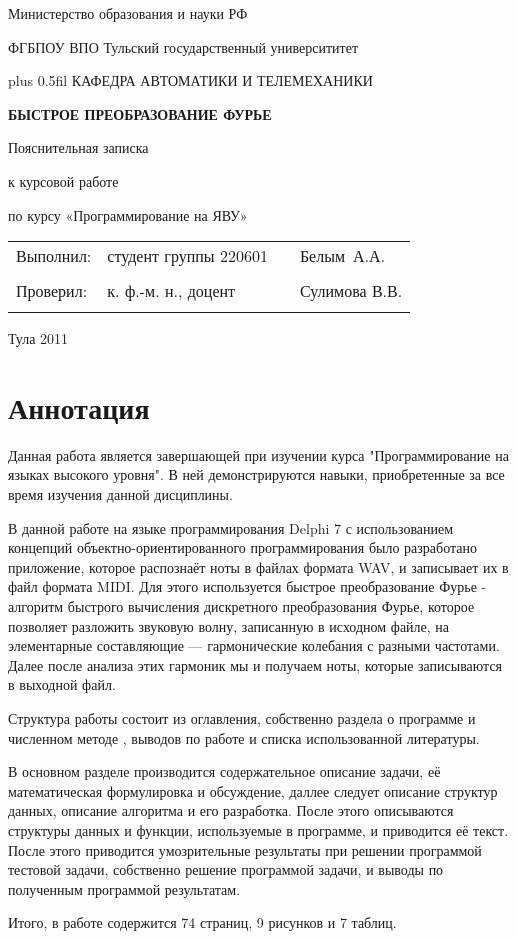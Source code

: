 \documentclass[a4paper,12pt,russian]{article}
\makeatletter
\renewcommand{\normalfont}{\fontsize{14}{20}\fontfamily{ftm}\linespread{1.25}\selectfont}
\renewcommand{\tiny}{\fontsize{12}{14}\fontfamily{ftm}\linespread{1.0}\selectfont}
\renewcommand{\maketitle}[1]{
\begin{titlepage}
\begin{center}\linespread{1}\parskip=0.0cm\normalfont
Министерство образования и науки РФ

ФГБПОУ ВПО Тульский государственный университитет

\vskip 0pt plus 0.5fil
КАФЕДРА АВТОМАТИКИ И ТЕЛЕМЕХАНИКИ

\vfill
\textbf{#1}

\vskip 2cm
Пояснительная записка 

к курсовой работе


по курсу «Программирование на ЯВУ»

\vfill

\vfill
\begin{tabular*}{\textwidth}{ll@{\extracolsep{\fill}}c@{\extracolsep{0pt}}l}
Выполнил: & студент группы 220601&&Белым~А.А.\\ \cline{3-3}
								&&\tiny{(подпись)}& 	\\
Проверил: & к. ф.-м. н., доцент &&Сулимова В.В.\\ \cline{3-3}
								&&\tiny{(подпись)}& 	\\
\end{tabular*}
\vfill
Тула 2011
\end{center}
\end{titlepage}
}
\newcommand{\ssec}[1]{\section{#1}\hspace*{\parindent}}
\makeatother
\begin{document}
\maketitle {БЫСТРОЕ ПРЕОБРАЗОВАНИЕ ФУРЬЕ}
\ssec{Аннотация}
\normalfont
Данная   работа   является   завершающей   при   изучении   курса 
"Программирование   на   языках   высокого   уровня".   В   ней   демонстрируются 
навыки, приобретенные за все время изучения данной дисциплины.
 
В данной работе на языке программирования Delphi 7 с использованием концепций объектно-ориентированного программирования было разработано приложение, которое распознаёт ноты в файлах формата WAV, и записывает их в файл формата MIDI. Для этого используется быстрое преобразование Фурье -   алгоритм быстрого вычисления дискретного преобразования Фурье, которое позволяет разложить звуковую волну, записанную в исходном файле, на элементарные составляющие — гармонические колебания с разными частотами. Далее после анализа этих гармоник мы и получаем ноты, которые записываются в выходной файл.

Структура работы состоит из оглавления, собственно раздела о программе и численном методе , выводов по работе и списка использованной литературы.

В основном разделе производится содержательное описание задачи, её математическая формулировка и обсуждение, даллее следует описание структур данных, описание алгоритма и его разработка. После этого описываются структуры данных и функции, используемые в программе, и приводится её текст. После этого приводится умозрительные результаты при решении программой тестовой задачи, собственно решение программой задачи, и выводы по полученным программой результатам.

Итого, в работе содержится 74 страниц, 9 рисунков и 7 таблиц.
\end{document}
